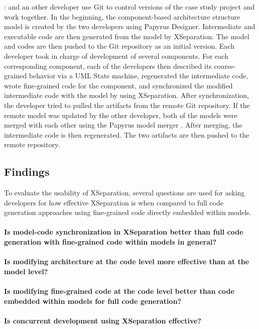 \vskip 0.1cm
\noindent
{}:
 and an other developer  use Git to control versions of the case study project and work together.
In the beginning, the component-based architecture structure model is created by the two developers using Papyrus Designer.
Intermediate and executable code are then generated from the model by XSeparation.
The model and codes are then pushed to the Git repository as an initial version.
Each developer took in charge of development of several components.
For each corresponding component, each of the developers then described its course-grained behavior via a UML State machine, regenerated the intermediate code, wrote fine-grained code for the component, and synchronized the modified intermediate code with the model by using XSeparation.
After synchronization, the developer tried to pulled the artifacts from the remote Git repository.
If the remote model was updated by the other developer, both of the models were merged with each other using the Papyrus model merger \cite{collaborativepapyrus}.
After merging, the intermediate code is then regenerated.
The two artifacts are then pushed to the remote repository.
  



\subsection{Findings}
To evaluate the usability of XSeparation, several questions are used for asking developers for how effective XSeparation is when compared to full code generation approaches using fine-grained code directly embedded within models.

\paragraph{Is model-code synchronization in XSeparation better than full code generation with fine-grained code within models in general?}

\paragraph{Is modifying architecture at the code level more effective than at the model level?}

\paragraph{Is modifying fine-grained code at the code level better than code embedded within models for full code generation?}

\paragraph{Is concurrent development using XSeparation effective?}

\lipsum[1-2]
